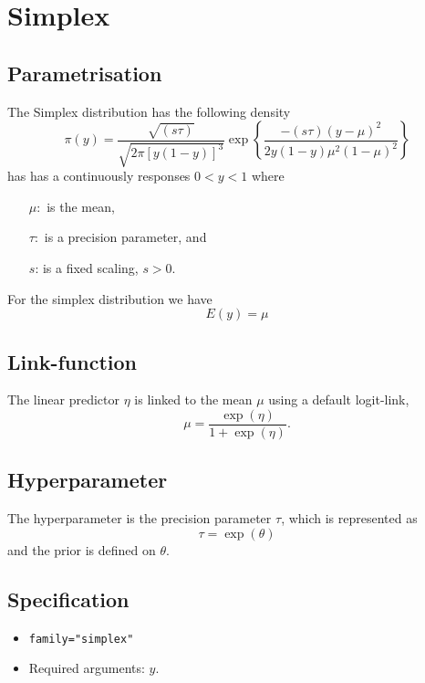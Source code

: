 \documentclass[a4paper,11pt]{article}
\begin{document}
\section*{Simplex}

\subsection*{Parametrisation}

The Simplex distribution has the following density
\begin{displaymath}
\pi(y)=\frac{\sqrt{(s\tau)}}{\sqrt{2\pi[y(1-y)]^3}}\exp\left\{\frac{-(s\tau)
      (y-\mu)^2}{2y(1-y)\mu^2(1-\mu)^2} \right\}
\end{displaymath}
has has a continuously responses $ 0<y<1$ where
\begin{itemize}
\item[$\mu:$] is the mean,
\item[$\tau:$] is a precision parameter, and
\item[$s$:] is a fixed scaling, $s>0$.    
\end{itemize}
For the simplex distribution we have 
\begin{displaymath}
E(y) = \mu 
\end{displaymath}

\subsection*{Link-function}
The linear predictor $\eta$ is linked to the mean $\mu$ using a
default logit-link,
\begin{displaymath}
    \mu = \frac{\exp{(\eta)}}{1+\exp{(\eta)}}.
\end{displaymath}

\subsection*{Hyperparameter}

The hyperparameter is the precision parameter $\tau$, which is
represented as
\begin{displaymath}
    \tau = \exp(\theta)
\end{displaymath}
and the prior is defined on $\theta$. 

\subsection*{Specification}

\begin{itemize}
\item \texttt{family="simplex"}
\item Required arguments: $y$.
\end{itemize}
\end{document}
